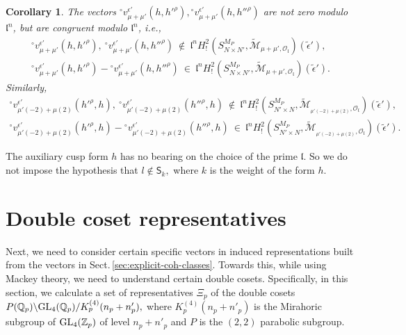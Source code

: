 \documentclass[11pt]{amsart}
\newtheorem{corollary}{Corollary}[section]
\newcommand{\mirp}[1]{K_p^{(4)}(#1)}
\begin{document}
\begin{corollary}
	The vectors ${^\circ}v^{\epsilon'}_{\mu + \mu'}(h,h'^\rho), {^\circ}v^{\epsilon'}_{\mu + \mu'}(h,h''^\rho)$ 
	are not zero modulo $\mathfrak{l}^n$, but are congruent modulo $\mathfrak{l}^n$, i.e.,
	\begin{gather*}
		{^\circ}v^{\epsilon'}_{\mu + \mu'}(h,h'^\rho), \ {^\circ}v^{\epsilon'}_{\mu + \mu'}(h,h''^\rho) \ \not\in \ 
		\mathfrak{l}^n  H^2_{!}(S^{M_P}_{N\times N'}, \widetilde{\mathcal{M}}_{\mu+\mu', \mathcal{O}_\mathfrak{l}})(\tilde{\epsilon}'),\\
		{^\circ}v^{\epsilon'}_{\mu + \mu'}(h,h'^\rho) - {^\circ}v^{\epsilon'}_{\mu + \mu'}(h,h''^\rho) \ \in \ 
		\mathfrak{l}^n H^2_{!}(S^{M_P}_{N\times N'}, \widetilde{\mathcal{M}}_{\mu+\mu', \mathcal{O}_\mathfrak{l}})(\tilde{\epsilon}').
	\end{gather*}
	Similarly,
	\begin{gather*}
		{^\circ}v^{\epsilon'}_{\mu'(-2)+\mu(2)}(h'^\rho,h), \ {^\circ}v^{\epsilon'}_{\mu'(-2)+\mu(2)}(h''^\rho,h)  \ \not\in \ 
		\mathfrak{l}^n  H^2_{!}(S^{M_P}_{N'\times N}, \widetilde{\mathcal{M}}_{_{\mu'(-2)+\mu(2)}, \mathcal{O}_\mathfrak{l}})(\tilde{\epsilon}'),\\
		{^\circ}v^{\epsilon'}_{\mu'(-2)+\mu(2)}(h'^\rho,h) - {^\circ}v^{\epsilon'}_{\mu'(-2)+\mu(2)}(h''^\rho,h) \ \in \ 
		\mathfrak{l}^n H^2_{!}(S^{M_P}_{N'\times N}, \widetilde{\mathcal{M}}_{_{\mu'(-2)+\mu(2)}, \mathcal{O}_\mathfrak{l}})(\tilde{\epsilon}').
	\end{gather*}
\end{corollary}

The auxiliary cusp form $h$ has no bearing on the choice of the prime $\mathfrak{l}$. 
So we do not impose the hypothesis that $l \not\in \mathsf{S}_{k},$ where $k$ is the weight of the form $h$.



\bigskip
\section{Double coset representatives}
\label{section: double-coset-representatives}
Next, we need to consider certain specific vectors in induced representations built from the vectors in Sect.\,\ref{sec:explicit-coh-classes}. 
Towards this, while using Mackey theory, we need to understand certain double cosets. Specifically, in this section, 
we calculate a set of representatives $\Xi_p$ of the double cosets 
$P(\mathbb{Q}_p) \backslash {\rm GL}_4(\mathbb{Q}_p) / \mirp{n_p+n_p'},$ 
where $\mirp{n_p+n'_p}$ is the Mirahoric subgroup of ${\rm GL}_4(\mathbb{Z}_p)$ of level $n_p+n'_p$ and $P$ is the $(2,2)$ parabolic subgroup.
\end{document}
